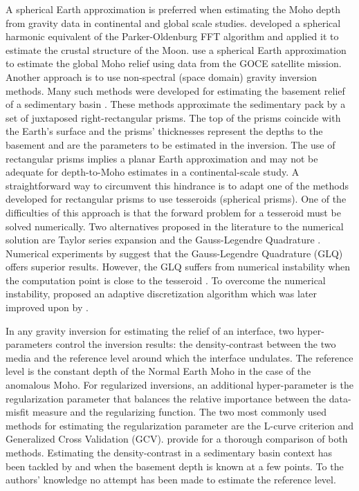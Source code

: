 A spherical Earth approximation is preferred when estimating the Moho depth
from gravity data in continental and global scale studies.
\citet{wieczorek1998} developed a spherical harmonic equivalent of the
Parker-Oldenburg FFT algorithm and applied it to estimate the crustal structure
of the Moon.
\citet{reguzzoni2013} use a spherical Earth approximation to estimate the
global Moho relief using data from the GOCE satellite mission.
Another approach is to use
non-spectral (space domain) gravity inversion methods.
Many such methods were developed for estimating the basement relief of a
sedimentary basin
\citep[e.g., ][]{barbosa1999a, barbosa1999b, martins2010, martins2011, sun2014}.
These methods approximate the sedimentary pack by a set of juxtaposed
right-rectangular prisms.
The top of the prisms coincide with the Earth's surface and the prisms'
thicknesses represent the depths to the basement and are the parameters to be
estimated in the inversion.
The use of rectangular prisms implies a planar Earth approximation and may not
be adequate for depth-to-Moho estimates in a continental-scale study.
A straightforward way to circumvent this hindrance is to adapt one of the
methods developed for rectangular prisms to use tesseroids (spherical prisms).
One of the difficulties of this approach is that the forward problem for a
tesseroid must be solved numerically.
Two alternatives proposed in the literature to the numerical solution are
Taylor series expansion \citep{heck2007, grombein2013}
and the Gauss-Legendre Quadrature
\citep{asgharzadeh2007}.
Numerical experiments by \citet{wild-pfeiffer2008} suggest that the
Gauss-Legendre Quadrature (GLQ) offers superior results.
However, the GLQ suffers from numerical instability when the computation point
is close to the tesseroid \citep{asgharzadeh2007}.
To overcome the numerical instability, \citet{li2011} proposed an adaptive
discretization algorithm which was later improved upon by \citet{uieda2016}.

In any gravity inversion for estimating the relief of an interface, two
hyper-parameters control the inversion results: the density-contrast between
the two media and the reference level around which the interface undulates.
The reference level is the constant depth of the Normal Earth Moho in the case
of the anomalous Moho.
For regularized inversions, an additional hyper-parameter is the regularization
parameter that balances the relative importance between the data-misfit measure
and the regularizing function.
The two most commonly used methods for estimating the regularization parameter
are the L-curve criterion and Generalized Cross Validation (GCV).
\citet{farquharson2004} provide for a thorough comparison of both methods.
Estimating the density-contrast in a sedimentary basin context has been tackled
by \citet{silva2006} and \citet{martins2010} when the basement depth is known
at a few points.
To the authors' knowledge no attempt has been made to estimate the reference
level.

